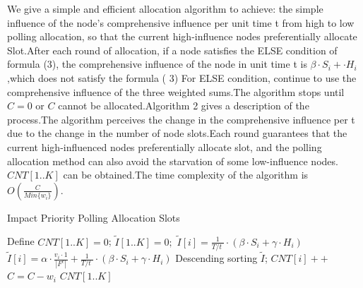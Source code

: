 \documentclass[conference]{IEEEtran}
\begin{document}
We give a simple and efficient allocation algorithm to achieve: the simple influence of the node's comprehensive influence per unit time t from high to low polling allocation, so that the current high-influence nodes preferentially allocate Slot.After each round of allocation, if a node satisfies the ELSE condition of formula (3), the comprehensive influence of the node in unit time t is $\beta \cdot S_i + \cdot H_i$,which does not satisfy the formula ( 3) For ELSE condition, continue to use the comprehensive influence of the three weighted sums.The algorithm stops until $C = 0$ or $C$ cannot be allocated.Algorithm 2 gives a description of the process.The algorithm perceives the change in the comprehensive influence per t due to the change in the number of node slots.Each round guarantees that the current high-influenced nodes preferentially allocate slot, and the polling allocation method can also avoid the starvation of some low-influence nodes. $CNT[1..K]$ can be obtained.The time complexity of the algorithm is $O(\frac{C}{Min\{w_i\}})$.


\begin{algorithm}[h]
\caption{Impact Priority Polling Allocation Slots}
\begin{algorithmic}[1]
\STATE Define $CNT[1..K] = 0$;   $\widetilde{I}[1..K] = 0;$
\STATE  $ \widetilde{I}[i]  = \frac{1}{{T}/{t}\;}\cdot (\beta \cdot {{S}_{i}}+\gamma \cdot {{H}_{i}})$ 
\ELSE 
\STATE  $ \widetilde{I}[i]  = \alpha \cdot \frac{{{v}_{i}\cdot 1}}{\left| {{F}^{c}} \right|}+\frac{1}{{T}/{t}\;} \cdot (\beta \cdot {{S}_{i}}+\gamma \cdot {{H}_{i}})$
\ENDIF
\ENDFOR
\STATE Descending sorting $ \widetilde{I}  $;
\STATE $CNT[i]++$
\STATE $C = C - w_i $
\ENDIF
\ENDFOR
\ENDWHILE
\RETURN $CNT[1..K]$
\label{code:recentEnd}
\end{algorithmic}
\end{algorithm}
\end{document}
